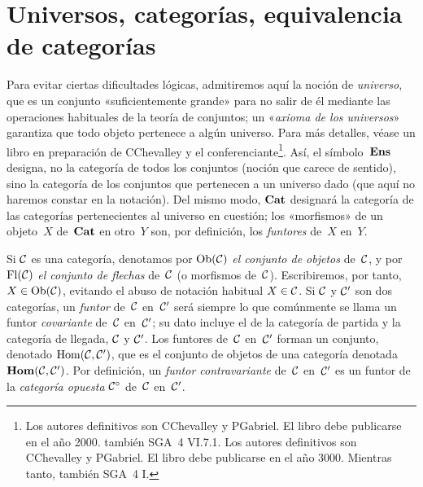 \section{Universos, categorías, equivalencia de categorías}
\label{VI.1}

Para evitar ciertas dificultades lógicas, admitiremos aquí la noción de
\emph{universo}, que es un conjunto «suficientemente grande» para no salir de
él mediante las operaciones habituales de la teoría de conjuntos; un
«\emph{axioma de los universos}» garantiza que todo objeto pertenece a algún
universo. Para más detalles, véase un libro en preparación de C\ptbl Chevalley
y el conferenciante\footnote{%
{Los autores definitivos son C\ptbl Chevalley y P\ptbl Gabriel. El libro debe
publicarse en el año 2000. \Cf también SGA~4 VI.7.1.}
{Los autores definitivos son C\ptbl Chevalley y P\ptbl Gabriel. El libro debe
publicarse en el año 3000. Mientras tanto, \cf también SGA~4 I.}}. Así, el
símbolo~$\Ens$
\label{indnot:fb}%
designa, no la categoría de todos los conjuntos (noción que carece de sentido),
sino la categoría de los conjuntos que pertenecen a un universo dado (que aquí
no haremos constar en la notación). Del mismo modo, $\Cat$
\label{indnot:fc}%
designará la categoría de las categorías pertenecientes al universo en
cuestión; los «morfismos» de un objeto~$X$ de~$\Cat$ en otro~$Y$ son, por
definición, los \emph{funtores} de~$X$ en~$Y$.

Si
$\cal{C}$ es una categoría, denotamos por $\Ob(\cal{C})$
\label{indnot:fd}%
\emph{el conjunto de objetos} de~$\cal{C}$, y por~$\Fl(\cal{C})$
\label{indnot:fe}%
\emph{el conjunto de flechas} de~$\cal{C}$ (o morfismos de~$\cal{C}$).
Escribiremos, por tanto, $X\in\Ob(\cal{C})$, evitando el abuso de notación
habitual $X\in\cal{C}$. Si $\cal{C}$ y $\cal{C}'$ son dos categorías, un
\emph{funtor} de~$\cal{C}$ en~$\cal{C}'$ será siempre lo que comúnmente se
llama un funtor \emph{covariante} de~$\cal{C}$ en~$\cal{C}'$; su dato incluye
el de la
{categoría de partida y la categoría de llegada}, $\cal{C}$ y $\cal{C}'$.
Los funtores de~$\cal{C}$ en~$\cal{C}'$ forman un conjunto, denotado
$\Hom(\cal{C},\cal{C}')$, que es el conjunto de objetos de una categoría
denotada $\SheafHom(\cal{C},\cal{C}')$.
\label{indnot:ff}%
Por definición, un \emph{funtor contravariante} de~$\cal{C}$ en~$\cal{C}'$ es
un funtor de la \emph{categoría opuesta} $\cal{C}^\circ$
\label{indnot:fg}%
de~$\cal{C}$ en~$\cal{C}'$.

